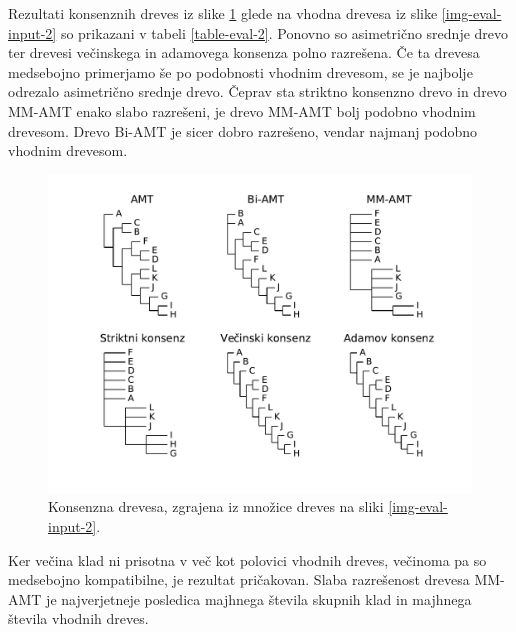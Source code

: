 \documentclass[a4paper, 12pt]{book}
\begin{document}
Rezultati konsenznih dreves iz slike \ref{img-eval-result-2} glede na vhodna drevesa iz slike \ref{img-eval-input-2} so prikazani v tabeli \ref{table-eval-2}. Ponovno so asimetrično srednje drevo ter drevesi večinskega in adamovega konsenza polno razrešena. Če ta drevesa medsebojno primerjamo še po podobnosti vhodnim drevesom, se je najbolje odrezalo asimetrično srednje drevo. Čeprav sta striktno konsenzno drevo in drevo MM-AMT enako slabo razrešeni, je drevo MM-AMT bolj podobno vhodnim drevesom. Drevo Bi-AMT je sicer dobro razrešeno, vendar 
najmanj podobno vhodnim drevesom. 

\begin{figure}[h!]
	\begin{center}
		\includegraphics[scale=0.65, clip=true, trim=1.5cm 1.5cm 1cm 0.8cm]{gfx/eval_gfx_2.pdf}
	\end{center}
	\caption{Konsenzna drevesa, zgrajena iz množice dreves na sliki \ref{img-eval-input-2}.}
	\label{img-eval-result-2}
\end{figure}

Ker večina klad ni prisotna v več kot polovici vhodnih dreves, večinoma pa so medsebojno kompatibilne, je rezultat pričakovan. Slaba razrešenost drevesa MM-AMT je najverjetneje posledica majhnega števila skupnih klad in majhnega števila vhodnih dreves.   
\end{document}
